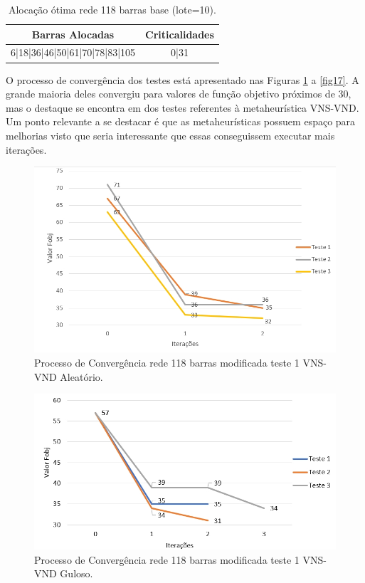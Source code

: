 \documentclass[12pt]{article}
\begin{document}
\begin{table}[H]
	\centering
	\caption{Alocação ótima rede 118 barras base (lote=10).}
	\begin{tabular}{|l|c|}
		\hline
		\multicolumn{1}{|c|}{\textbf{Barras Alocadas}} & \multicolumn{1}{l|}{\textbf{Criticalidades}} \\
		\hline
		6|18|36|46|50|61|70|78|83|105 & 0|31 \\
		\hline
	\end{tabular}%
	\label{tab26}%
\end{table}%

O processo de convergência dos testes está apresentado nas Figuras \ref{fig14} a \ref{fig17}. A grande maioria deles convergiu para valores de função objetivo próximos de 30, mas o destaque se encontra em dos testes referentes à metaheurística VNS-VND. Um ponto relevante a se destacar é que as metaheurísticas possuem espaço para melhorias visto que seria interessante que essas conseguissem executar mais iterações.


\begin{figure}[H]
	\centering 
	\includegraphics[scale=0.7]{figuras/VND_118_1_Aleat.jpg}
	\caption{Processo de Convergência rede 118 barras modificada teste 1 VNS-VND Aleatório.}
	\label{fig14} %
\end{figure}


\begin{figure}[H]
	\centering 
	\includegraphics[scale=0.7]{figuras/VND_118_1_Guloso.jpg}
	\caption{Processo de Convergência rede 118 barras modificada teste 1 VNS-VND Guloso.}
	\label{fig15} %
\end{figure}
\end{document}
